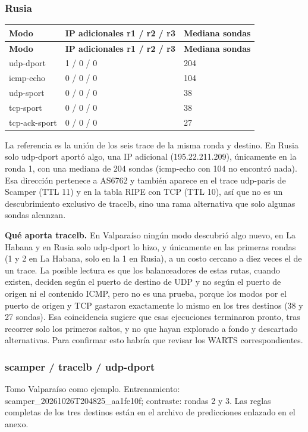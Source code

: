 \subsubsection{Rusia}
\begingroup
\fontsize{9}{11}\selectfont
\addtocounter{table}{-1}
\begin{longtable}{p{3.2cm}p{8cm}p{3cm}}
\toprule
\textbf{Modo} & \textbf{IP adicionales r1 / r2 / r3} & \textbf{Mediana sondas} \\ \midrule
\endfirsthead
\toprule
\textbf{Modo} & \textbf{IP adicionales r1 / r2 / r3} & \textbf{Mediana sondas} \\ \midrule
\endhead
udp-dport & 1 / 0 / 0 & 204 \\
icmp-echo & 0 / 0 / 0 & 104 \\
udp-sport & 0 / 0 / 0 & 38 \\
tcp-sport & 0 / 0 / 0 & 38 \\
tcp-ack-sport & 0 / 0 / 0 & 27 \\
\bottomrule
\end{longtable}
\endgroup
La referencia es la unión de los seis trace de la misma ronda y destino. En Rusia solo udp-dport aportó algo, una IP adicional (195.22.211.209), únicamente en la ronda 1, con una mediana de 204 sondas (icmp-echo con 104 no encontró nada). Esa dirección pertenece a AS6762 y también aparece en el trace udp-paris de Scamper (TTL 11) y en la tabla RIPE con TCP (TTL 10), así que no es un descubrimiento exclusivo de tracelb, sino una rama alternativa que solo algunas sondas alcanzan.

\textbf{Qué aporta tracelb.}
En Valparaíso ningún modo descubrió algo nuevo, en La Habana y en Rusia solo udp-dport lo hizo, y únicamente en las primeras rondas (1 y 2 en La Habana, solo en la 1 en Rusia), a un costo cercano a diez veces el de un trace. La posible lectura es que los balanceadores de estas rutas, cuando existen, deciden según el puerto de destino de UDP y no según el puerto de origen ni el contenido ICMP, pero no es una prueba, porque los modos por el puerto de origen y TCP gastaron exactamente lo mismo en los tres destinos (38 y 27 sondas). Esa coincidencia sugiere que esas ejecuciones terminaron pronto, tras recorrer solo los primeros saltos, y no que hayan explorado a fondo y descartado alternativas. Para confirmar esto habría que revisar los WARTS correspondientes.


\subsubsection{scamper / tracelb / udp-dport}
Tomo Valparaíso como ejemplo. Entrenamiento: scamper\_\allowbreak{}20261026T204825\_\allowbreak{}aa1fe10f; contraste: rondas 2 y 3. Las reglas completas de los tres destinos están en el archivo de predicciones enlazado en el anexo.

